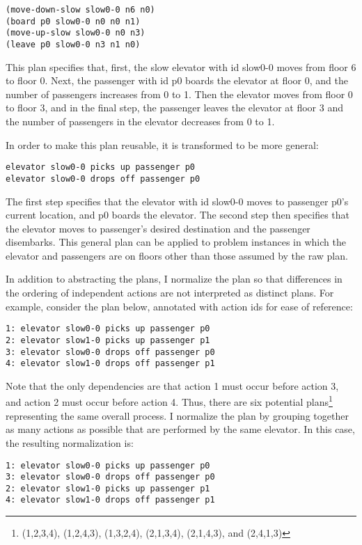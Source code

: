 \begin{verbatim}
(move-down-slow slow0-0 n6 n0)
(board p0 slow0-0 n0 n0 n1)
(move-up-slow slow0-0 n0 n3)
(leave p0 slow0-0 n3 n1 n0)
\end{verbatim}

\noindent
This plan specifies that, first, the slow elevator with id slow0-0 moves from floor 6 to floor 0.  Next, the passenger with id p0 boards the elevator at floor 0, and the number of passengers increases from 0 to 1.  Then the elevator moves from floor 0 to floor 3, and in the final step, the passenger leaves the elevator at floor 3 and the number of passengers in the elevator decreases from 0 to 1.

In order to make this plan reusable, it is transformed to be  more general:

\begin{verbatim}
elevator slow0-0 picks up passenger p0
elevator slow0-0 drops off passenger p0
\end{verbatim}

The first step specifies that the elevator with id slow0-0 moves to passenger p0's current location, and p0 boards the elevator.  The second step then specifies that the elevator moves to passenger's desired destination and the passenger disembarks.  This general plan can  be applied to problem instances in which the elevator and passengers are on floors other than those assumed by the raw plan.

In addition to abstracting the plans, I normalize the plan so that differences in the ordering of independent actions are not interpreted as distinct plans.  For example, consider the plan below, annotated with action ids for ease of reference: 

\begin{verbatim}
1: elevator slow0-0 picks up passenger p0
2: elevator slow1-0 picks up passenger p1
3: elevator slow0-0 drops off passenger p0
4: elevator slow1-0 drops off passenger p1
\end{verbatim}

Note that the only dependencies are that action 1 must occur before action 3, and action 2 must occur before action 4.  Thus, there are six potential plans\footnote{(1,2,3,4), (1,2,4,3), (1,3,2,4), (2,1,3,4), (2,1,4,3), and (2,4,1,3)} representing the same overall process.  I normalize the plan by grouping together as many actions as possible that are performed by the same elevator.  In this case, the resulting normalization is:

\begin{verbatim}
1: elevator slow0-0 picks up passenger p0
3: elevator slow0-0 drops off passenger p0
2: elevator slow1-0 picks up passenger p1
4: elevator slow1-0 drops off passenger p1
\end{verbatim}

